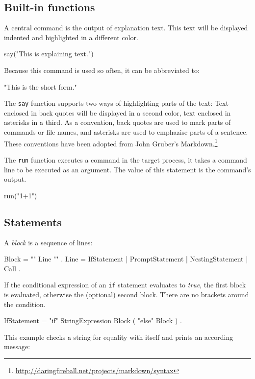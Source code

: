 \documentclass[paper=a4,twoside,abstract=on,cleardoublepage=empty,numbers=noenddot,toc=bib,toc=listof,12pt,appendixprefix=true]{scrreprt}
\begin{document}
\subsection{Built-in functions}

A central command is the output of explanation text. This text will be displayed indented and highlighted in a different color.

\begin{nutsh}
say("This is explaining text.")
\end{nutsh}
%
Because this command is used so often, it can be abbreviated to:

\begin{nutsh}
"This is the short form."
\end{nutsh}
%
The \texttt{say} function supports two ways of highlighting parts of the text: Text enclosed in back quotes will be displayed in a second color, text enclosed in asterisks in a third. As a convention, back quotes are used to mark parts of commands or file names, and asterisks are used to emphazise parts of a sentence. These conventions have been adopted from John Gruber's Markdown.\footnote{\url{http://daringfireball.net/projects/markdown/syntax}}

The \texttt{run} function executes a command in the target process, it takes a command line to be executed as an argument. The value of this statement is the command's output.

\begin{nutsh}
run("1+1")
\end{nutsh}

\subsection{Statements}
\label{sec:statements}


A \emph{block} is a sequence of lines:

\begin{ebnf}
Block = "{" { Line } "}" .
Line = IfStatement | PromptStatement | NestingStatement | Call .
\end{ebnf}


If the conditional expression of an \texttt{if} statement evaluates to \emph{true}, the first block is evaluated, otherwise the (optional) second block. There are no brackets around the condition.

\begin{ebnf}
IfStatement = "if" StringExpression Block ( "else" Block ) .
\end{ebnf}
%
This example checks a string for equality with itself and prints an according message:
\end{document}
